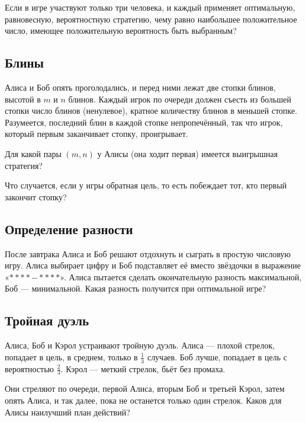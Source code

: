 Если в игре участвуют только три человека, и каждый применяет оптимальную, равновесную, вероятностную стратегию, чему равно наибольшее положительное число, имеющее положительную вероятность быть выбранным?

\subsection*{Блины}%

Алиса и Боб опять проголодались, и перед ними лежат две стопки блинов, высотой в $m$ и $n$ блинов.
Каждый игрок по очереди должен съесть из большей стопки число блинов (ненулевое), кратное количеству блинов в меньшей стопке.
Разумеется, последний блин в каждой стопке непропечённый, так что игрок, который первым заканчивает стопку, проигрывает.

Для какой пары $(m,n)$ у Алисы (она ходит первая) имеется выигрышная стратегия?

Что случается, если у игры обратная цель, то есть побеждает тот, кто первый закончит стопку?

\subsection*{Определение разности}%

После завтрака Алиса и Боб решают отдохнуть и сыграть в простую числовую игру.
Алиса выбирает цифру и Боб подставляет её вместо звёздочки в выражение «$**** - ****$». 
Алиса пытается сделать окончательную разность максимальной, Боб --- минимальной.
Какая разность получится при оптимальной игре?

\subsection*{Тройная дуэль}%

Алиса, Боб и Кэрол устраивают тройную дуэль.
Алиса --- плохой стрелок, попадает в цель, в среднем, только в $\tfrac13$ случаев.
Боб лучше, попадает в цель с вероятностью $\tfrac23$.
Кэрол --- меткий стрелок, бьёт без промаха.

Они стреляют по очереди, первой Алиса, вторым Боб и третьей Кэрол, затем опять Алиса, и так далее, пока не останется только один стрелок.
Каков для Алисы наилучший план действий?
